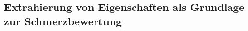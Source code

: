 

\subsection{Extrahierung von Eigenschaften als Grundlage zur Schmerzbewertung}
\label{sec:segmentFeatures}


